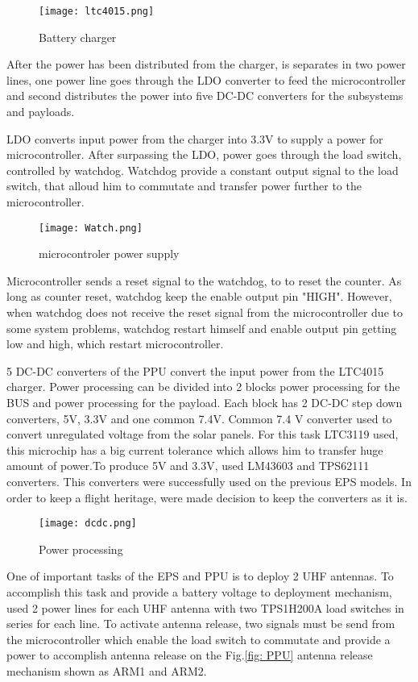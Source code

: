   \begin{figure}[h]
  	\centering
  	\texttt{[image: ltc4015.png]}
  	\caption{Battery charger}
  	\label{fig: ltc40151}
  \end{figure}
  
 After the power has been distributed from the charger, is separates in two power lines, one power line goes through the LDO converter to feed the microcontroller and second distributes the power into five DC-DC converters for the subsystems and payloads.
 
 LDO converts input power from the charger into 3.3V to supply a power for microcontroller. After surpassing the LDO, power goes through the load switch, controlled by watchdog. Watchdog provide a constant output signal to the load switch, that alloud him to commutate and transfer power further to the microcontroller. 
  
    \begin{figure}[h]
    	\centering
    	\texttt{[image: Watch.png]}
    	\caption{microcontroler power supply}
    	\label{fig: ltc4015}
    \end{figure}
  Microcontroller sends a reset signal to the watchdog, to to reset the counter. As long as counter reset, watchdog keep the enable output pin "HIGH". However, when watchdog does not receive the reset signal from the microcontroller due to some system problems, watchdog restart himself and enable output pin getting low and high, which restart microcontroller.
  
  5 DC-DC converters of the PPU convert the input power from the LTC4015 charger. Power processing can be divided into 2 blocks power processing for the BUS and power processing for the payload. Each block has 2 DC-DC step down converters, 5V, 3.3V and one common 7.4V. Common 7.4 V converter used to convert unregulated voltage from the solar panels. For this task LTC3119 used, this microchip has a big current tolerance which allows him to transfer huge amount of power.To produce 5V and 3.3V, used LM43603 and TPS62111 converters. This converters were successfully used on the previous EPS models. In order to keep a flight heritage, were made decision to keep the converters as it is. 
  
   \begin{figure}[h]
   	\centering
   	\texttt{[image: dcdc.png]}
   	\caption{Power processing}
   	\label{fig: ltc4015}
   \end{figure}
  
  One of important tasks of the EPS and PPU is to deploy 2 UHF antennas. To accomplish this task and provide a battery voltage to deployment mechanism, used 2 power lines for each UHF antenna with two TPS1H200A load switches in series for each line. To activate antenna release, two signals must be send from the microcontroller which enable the load switch to commutate and provide a power to accomplish antenna release on the Fig.\ref{fig: PPU} antenna release mechanism shown as ARM1 and ARM2. 
  
